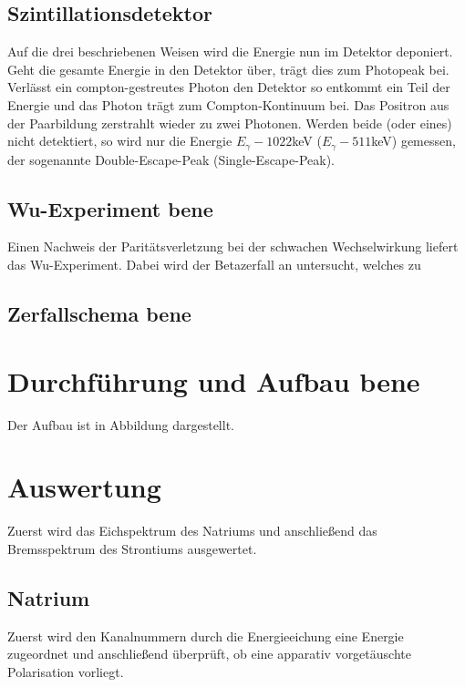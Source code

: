 \documentclass[twoside,colorback,accentcolor=tud4c,11pt]{tudreport}
\begin{document}
\section{Szintillationsdetektor}
Auf die drei beschriebenen Weisen wird die Energie nun im Detektor deponiert. Geht die gesamte Energie in den Detektor über, trägt dies zum Photopeak bei. Verlässt ein compton-gestreutes Photon den Detektor so entkommt ein Teil der Energie und das Photon trägt zum Compton-Kontinuum bei. Das Positron aus der Paarbildung zerstrahlt wieder zu zwei Photonen. Werden beide (oder eines) nicht detektiert, so wird nur die Energie $ E_\gamma-1022 $keV ($ E_\gamma-511 $keV) gemessen, der sogenannte Double-Escape-Peak (Single-Escape-Peak).
\section{Wu-Experiment bene}
Einen Nachweis der Paritätsverletzung bei der schwachen Wechselwirkung liefert das Wu-Experiment. Dabei wird der Betazerfall an  untersucht, welches zu 

\section{Zerfallschema bene}
	
\chapter{Durchführung und Aufbau bene}
Der Aufbau ist in Abbildung    dargestellt. 
  
     	
\chapter{Auswertung}
Zuerst wird das Eichspektrum des Natriums und anschließend das Bremsspektrum des Strontiums ausgewertet.
\section{Natrium}
Zuerst wird den Kanalnummern durch die Energieeichung eine Energie zugeordnet und anschließend überprüft, ob eine apparativ vorgetäuschte Polarisation vorliegt.
\end{document}
